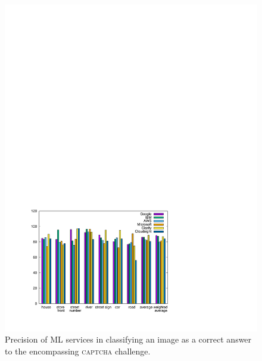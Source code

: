 \documentclass[sigconf,review,anonymous]{acmart}
\newcommand{\captcha}{\textsc{captcha}\xspace}
\begin{document}
\begin{figure}[t]
\centering
\includegraphics[width=\columnwidth]{images/precisions-1.pdf}
\caption{Precision of ML services in classifying an image as a correct answer to the encompassing \captcha challenge.}
\label{res-precisions}
\end{figure}
\end{document}
